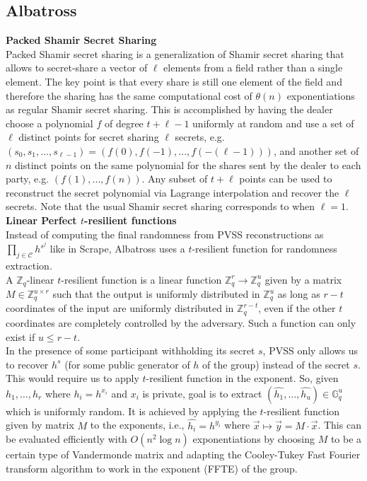 \documentclass[letterpaper,twocolumn,10pt]{article}
\theoremstyle{definition}
\theoremstyle{remark}
\begin{document}
\subsection {Albatross}
\label{appendix:albatross}

\noindent\textbf{Packed Shamir Secret Sharing} \\
Packed Shamir secret sharing is a generalization of Shamir secret sharing that allows to secret-share a vector of $\ell$ elements from a field rather than a single element. The key point is that every share is still one element of the field and therefore the sharing has the same computational cost of $\theta(n)$ exponentiations as regular Shamir secret sharing. This is accomplished by having the dealer choose a polynomial $f$ of degree $t+\ell-1$ uniformly at random and use a set of $\ell$ distinct points for secret sharing $\ell$ secrets, e.g. $(s_0, s_1, ..., s_{\ell - 1}) = (f(0), f(-1), ..., f(-(\ell - 1)))$, and another set of $n$ distinct points on the same polynomial for the shares sent by the dealer to each party, e.g. $(f(1), ..., f(n))$. Any subset of $t+\ell$ points can be used to reconstruct the secret polynomial via Lagrange interpolation and recover the $\ell$ secrets. Note that the usual Shamir secret sharing corresponds to when $\ell = 1$.\\

\noindent\textbf{Linear Perfect $t$-resilient functions}\\
Instead of computing the final randomness from PVSS reconstructions as $\prod_{j \in \mathcal{C}} h^{s^j}$ like in Scrape, Albatross uses a $t$-resilient function for randomness extraction.\\
A $\mathbb{Z}_q$-linear $t$-resilient function is a linear function $\mathbb{Z}_q^r \rightarrow \mathbb{Z}_q^u$ given by a matrix $M \in \mathbb{Z}_q^{u \times r}$ such that the output is uniformly distributed in  $\mathbb{Z}_q^u$ as long as $r-t$ coordinates of the input are uniformly distributed in  $\mathbb{Z}_q^{r-t}$, even if the other $t$ coordinates are completely controlled by the adversary. Such a function can only exist if $u \le r-t$.\\
In the presence of some participant withholding its secret $s$, PVSS only allows us to recover $h^s$ (for some public generator of $h$ of the group) instead of the secret $s$. This would require us to apply $t$-resilient function in the exponent. So, given $h_1, \ldots, h_r$ where $h_i = h^{x_i}$ and $x_i$ is private,  goal is to extract $(\hat{h_1},\ldots, \hat{h_u}) \in \mathbb{G}_q^u$ which is uniformly random. It is achieved by applying the $t$-resilient function given by matrix $M$ to the exponents, i.e., $\hat{h_i} = h^{y_i}$ where $\vec{x} \mapsto \vec{y} = M \cdot \vec{x}$. This can be evaluated efficiently with $O(n^2 \log n)$ exponentiations by choosing $M$ to be a certain type of Vandermonde matrix and adapting the Cooley-Tukey Fast Fourier transform algorithm to work in the exponent (FFTE) \cite{cascudo2020albatross} of the group.\\
\end{document}
